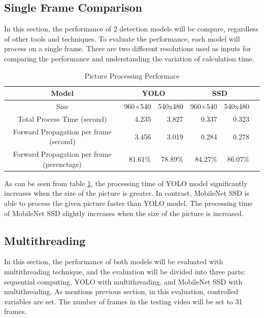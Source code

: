         \subsection{Single Frame Comparison}
            In this section, the performance of 2 detection models will be compare, regardless of other tools and techniques.
            To evaluate the performance, each model will process on a single frame.
            There are two different resolutions used as inputs for comparing the performance and understanding the variation of calculation time.

            \begin{table}[!htp]\centering
                \scriptsize
                \begin{tabular}{lrrrrrr}\toprule
                    \multicolumn{2}{c}{Model} &\multicolumn{2}{c}{YOLO} &\multicolumn{2}{c}{SSD} \\\midrule
                    \multicolumn{2}{c}{Size} &960×540 &540x480 &960×540 &540x480 \\
                    \multicolumn{2}{c}{Total Process Time (second)} &4.235 &3.827 &0.337 &0.323 \\
                    \multicolumn{2}{c}{Forward Propagation per frame (second)} &3.456 &3.019 &0.284 &0.278 \\
                    \multicolumn{2}{c}{Forward Propagation per frame (perenctage)} &81.61\% &78.89\% &84.27\% &86.07\% \\
                    \bottomrule
                \end{tabular}

                \caption{Picture Processing Performace}\label{performance:picture}
            \end{table}

            As can be seen from table \ref{performance:picture}, the processing time of YOLO model significantly increases when the size of the picture is greater.
            In contrast, MobileNet SSD is able to process the given picture faster than YOLO model.
            The processing time of MobileNet SSD slightly increases when the size of the picture is increased.

        \subsection{Multithreading}

            In this section, the performance of both models will be evaluated with multithreading technique,
            and the evaluation will be divided into three parts: sequential computing, YOLO with multithreading, and MobileNet SSD with multithreading.
            As mentions previous section, in this evaluation, controlled variables are set.
            The number of frames in the testing video will be set to 31 frames.

